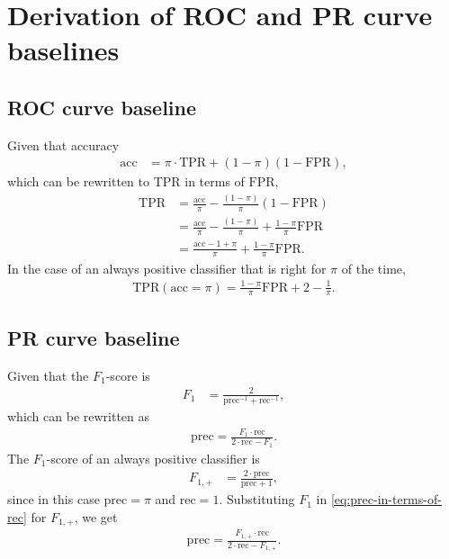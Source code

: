 \section{Derivation of ROC and PR curve baselines}
\subsection{ROC curve baseline}\label{subsec:roc-curve-baseline-derivation}
Given that accuracy
\begin{align}
    \text{acc} &= \pi \cdot\text{TPR} + (1 - \pi) (1 - \text{FPR}),
\end{align}
which can be rewritten to $\text{TPR}$ in terms of $\text{FPR}$,
\begin{align}
    \text{TPR} &= \frac{\text{acc}}{\pi} - \frac{(1-\pi)}{\pi}(1 - \text{FPR}) \\
               &= \frac{\text{acc}}{\pi} - \frac{(1-\pi)}{\pi} + \frac{1-\pi}{\pi}\text{FPR} \\ 
               &= \frac{\text{acc} - 1 + \pi}{\pi} + \frac{1-\pi}{\pi}\text{FPR}.
\end{align}
In the case of an always positive classifier that is right for $\pi$ of the time,
\begin{align}
    \text{TPR}(\text{acc} = \pi) = \frac{1-\pi}{\pi}\text{FPR} + 2 - \frac{1}{\pi}.
\end{align}

\subsection{PR curve baseline}\label{subsec:pr-curve-baseline-derivation}
Given that the $F_1$-score is
\begin{align}
    F_1 &= \frac{2}{\text{prec}^{-1} + \text{rec}^{-1}},
\end{align}
which can be rewritten as
\begin{align}\label{eq:prec-in-terms-of-rec}
    \text{prec} = \frac{F_1 \cdot \text{rec}}{2\cdot \text{rec} - F_1}.
\end{align}
The $F_1$-score of an always positive classifier is
\begin{align}
    F_{1, +} &= \frac{2 \cdot \text{prec}}{\text{prec} + 1},
\end{align}
since in this case $\text{prec} = \pi$ and $\text{rec} = 1$.
Substituting $F_1$ in \cref{eq:prec-in-terms-of-rec} for $F_{1, +}$, we get
\begin{align}
    \text{prec} = \frac{F_{1, +} \cdot \text{rec}}{2\cdot \text{rec} - F_{1, +}}.
\end{align}

